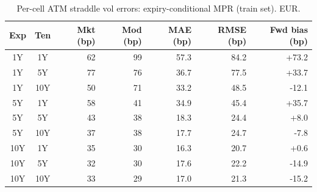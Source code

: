 \begin{table}[H]
\centering
\caption{Per-cell ATM straddle vol errors: expiry-conditional MPR (train set). EUR.}
\label{tab:expiry_mpr_per_cell_train}
\small
\begin{tabular}{@{}ccrrrrr@{}}
\toprule
\textbf{Exp} & \textbf{Ten} & \textbf{Mkt (bp)} & \textbf{Mod (bp)} & \textbf{MAE (bp)} & \textbf{RMSE (bp)} & \textbf{Fwd bias (bp)} \\
\midrule
  1Y & 1Y & 62 & 99 & 57.3 & 84.2 & +73.2 \\
  1Y & 5Y & 77 & 76 & 36.7 & 77.5 & +33.7 \\
  1Y & 10Y & 50 & 71 & 33.2 & 48.5 & -12.1 \\
  \midrule
  5Y & 1Y & 58 & 41 & 34.9 & 45.4 & +35.7 \\
  5Y & 5Y & 43 & 38 & 18.3 & 24.4 & +8.0 \\
  5Y & 10Y & 37 & 38 & 17.7 & 24.7 & -7.8 \\
  \midrule
  10Y & 1Y & 35 & 30 & 16.3 & 20.7 & +0.6 \\
  10Y & 5Y & 32 & 30 & 17.6 & 22.2 & -14.9 \\
  10Y & 10Y & 33 & 29 & 17.0 & 21.3 & -15.2 \\
\bottomrule
\end{tabular}
\end{table}